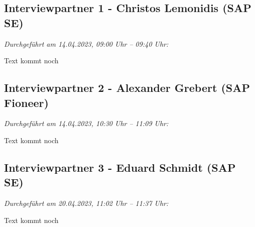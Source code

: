 \newpage
\subsection{Interviewpartner 1 - Christos Lemonidis (SAP SE)}

\textit{Durchgeführt am 14.04.2023, 09:00 Uhr -- 09:40 Uhr:}

Text kommt noch

\newpage

\subsection{Interviewpartner 2 - Alexander Grebert (SAP Fioneer)}

\textit{Durchgeführt am 14.04.2023, 10:30 Uhr -- 11:09 Uhr:}

Text kommt noch 

\newpage
\subsection{Interviewpartner 3 - Eduard Schmidt (SAP SE)}

\textit{Durchgeführt am 20.04.2023, 11:02 Uhr -- 11:37 Uhr:}

Text kommt noch

\newpage


